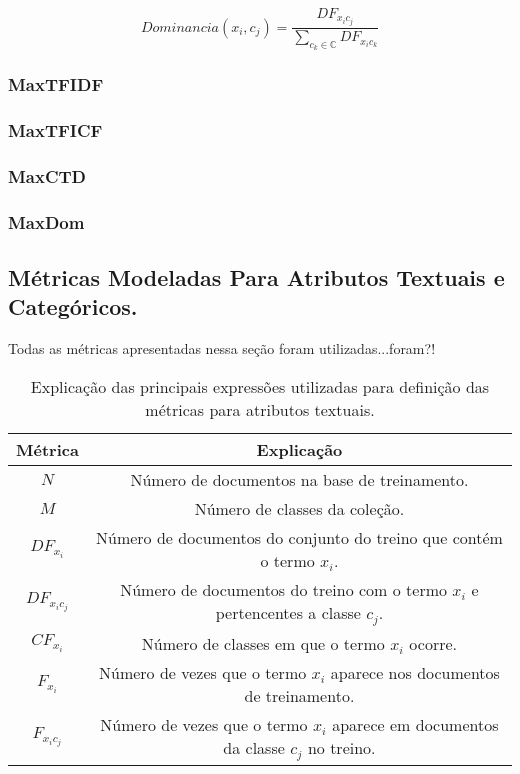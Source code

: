 \begin{equation}\label{eqn::dom}
   Dominancia(x_i, c_j) = \frac{ DF_{x_ic_j} } { \sum\limits_{c_k \in \mathbb{C}} DF_{ x_ic_k } } 
\end{equation}

\subsubsection{MaxTFIDF}
\label{subsubsection::maxtfidf}

\subsubsection{MaxTFICF} 
\label{subsubsection::maxtficf}

\subsubsection{MaxCTD}
\label{subsubsection::maxctd}

\subsubsection{MaxDom}
\label{subsubsection::maxdom}



\subsection{Métricas Modeladas Para Atributos Textuais e Categóricos.}
\label{subsec::pg_metricas_conteudo}


Todas as métricas apresentadas nessa seção foram utilizadas...foram?!

\begin{table}[ht*]
\centering
\begin{tabular}{|c|c|}
\toprule
    \textbf{Métrica} & \textbf{Explicação} \\
\midrule
    $N$           & Número de documentos na base de treinamento. \tabularnewline \hline
    $M$           & Número de classes da coleção. \tabularnewline \hline
    $DF_{x_i} $   & Número de documentos do conjunto do treino que contém o termo $x_i$. \tabularnewline \hline
    $DF_{x_ic_j}$ & Número de documentos do treino com o termo $x_i$ e pertencentes a classe $c_j$. \tabularnewline \hline
    $CF_{x_i}$    & Número de classes em que o termo $x_i$ ocorre. \tabularnewline \hline 
    $F_{x_i}$     & Número de vezes que o termo $x_i$ aparece nos documentos de treinamento. \tabularnewline \hline
    $F_{x_ic_j}$  & Número de vezes que o termo $x_i$ aparece em documentos da classe $c_j$ no treino. \tabularnewline 
\bottomrule
\end{tabular}
\label{table::metricas_textuais}
\caption{Explicação das principais expressões utilizadas para definição das métricas para atributos textuais.}
\end{table}



